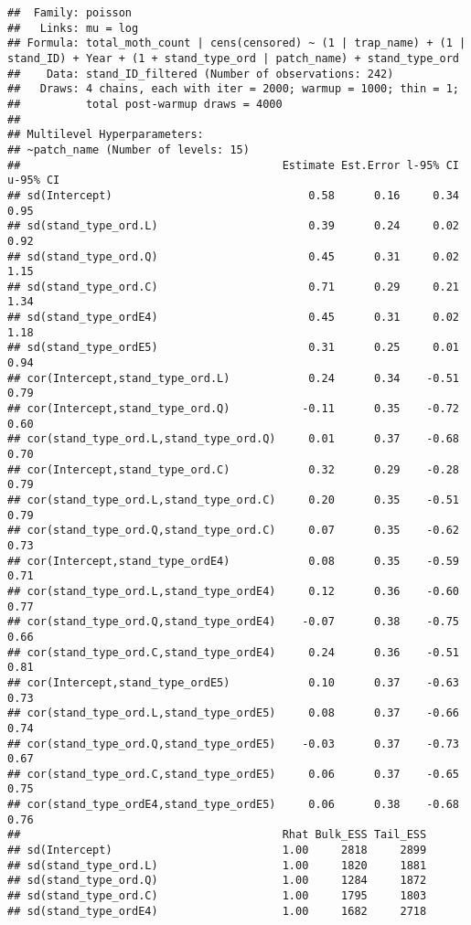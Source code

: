 \documentclass[
]{article}
\begin{document}
\begin{verbatim}
##  Family: poisson 
##   Links: mu = log 
## Formula: total_moth_count | cens(censored) ~ (1 | trap_name) + (1 | stand_ID) + Year + (1 + stand_type_ord | patch_name) + stand_type_ord 
##    Data: stand_ID_filtered (Number of observations: 242) 
##   Draws: 4 chains, each with iter = 2000; warmup = 1000; thin = 1;
##          total post-warmup draws = 4000
## 
## Multilevel Hyperparameters:
## ~patch_name (Number of levels: 15) 
##                                        Estimate Est.Error l-95% CI u-95% CI
## sd(Intercept)                              0.58      0.16     0.34     0.95
## sd(stand_type_ord.L)                       0.39      0.24     0.02     0.92
## sd(stand_type_ord.Q)                       0.45      0.31     0.02     1.15
## sd(stand_type_ord.C)                       0.71      0.29     0.21     1.34
## sd(stand_type_ordE4)                       0.45      0.31     0.02     1.18
## sd(stand_type_ordE5)                       0.31      0.25     0.01     0.94
## cor(Intercept,stand_type_ord.L)            0.24      0.34    -0.51     0.79
## cor(Intercept,stand_type_ord.Q)           -0.11      0.35    -0.72     0.60
## cor(stand_type_ord.L,stand_type_ord.Q)     0.01      0.37    -0.68     0.70
## cor(Intercept,stand_type_ord.C)            0.32      0.29    -0.28     0.79
## cor(stand_type_ord.L,stand_type_ord.C)     0.20      0.35    -0.51     0.79
## cor(stand_type_ord.Q,stand_type_ord.C)     0.07      0.35    -0.62     0.73
## cor(Intercept,stand_type_ordE4)            0.08      0.35    -0.59     0.71
## cor(stand_type_ord.L,stand_type_ordE4)     0.12      0.36    -0.60     0.77
## cor(stand_type_ord.Q,stand_type_ordE4)    -0.07      0.38    -0.75     0.66
## cor(stand_type_ord.C,stand_type_ordE4)     0.24      0.36    -0.51     0.81
## cor(Intercept,stand_type_ordE5)            0.10      0.37    -0.63     0.73
## cor(stand_type_ord.L,stand_type_ordE5)     0.08      0.37    -0.66     0.74
## cor(stand_type_ord.Q,stand_type_ordE5)    -0.03      0.37    -0.73     0.67
## cor(stand_type_ord.C,stand_type_ordE5)     0.06      0.37    -0.65     0.75
## cor(stand_type_ordE4,stand_type_ordE5)     0.06      0.38    -0.68     0.76
##                                        Rhat Bulk_ESS Tail_ESS
## sd(Intercept)                          1.00     2818     2899
## sd(stand_type_ord.L)                   1.00     1820     1881
## sd(stand_type_ord.Q)                   1.00     1284     1872
## sd(stand_type_ord.C)                   1.00     1795     1803
## sd(stand_type_ordE4)                   1.00     1682     2718

\end{verbatim}
\end{document}

